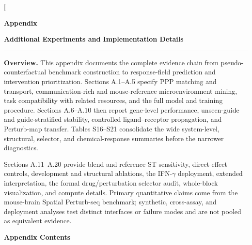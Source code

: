 \documentclass[sigconf,review,balance=false]{acmart}
\newcommand{\ppp}{\textsc{PPP}\xspace}
\begin{document}
\twocolumn[{
\begin{minipage}{\textwidth}
\centering
{\LARGE\bfseries Appendix\par}
\vspace{3pt}
{\large\bfseries Additional Experiments and Implementation Details\par}
\vspace{6pt}
\hrule
\vspace{6pt}

\raggedright\normalsize
\textbf{Overview.}
This appendix documents the complete evidence chain from pseudo-counterfactual
benchmark construction to response-field prediction and intervention
prioritization. Sections A.1--A.5 specify \ppp matching and transport,
communication-rich and mouse-reference microenvironment mining, task
compatibility with related resources, and the full model and training
procedure. Sections A.6--A.10 then report gene-level performance, unseen-guide
and guide-stratified stability, controlled ligand--receptor propagation, and
Perturb-map transfer. Tables S16--S21 consolidate the wide system-level,
structural, selector, and chemical-response summaries before the narrower
diagnostics.

\vspace{2pt}
Sections A.11--A.20 provide blend and reference-ST sensitivity, direct-effect
controls, development and structural ablations, the IFN-$\gamma$ deployment,
extended interpretation, the formal drug/perturbation selector audit,
whole-block visualization, and compute details. Primary quantitative claims
come from the mouse-brain Spatial Perturb-seq benchmark; synthetic,
cross-assay, and deployment analyses test distinct interfaces or failure modes
and are not pooled as equivalent evidence.

\vspace{5pt}
{\large\bfseries Appendix Contents\par}
\vspace{3pt}


\end{minipage}}
\end{document}
